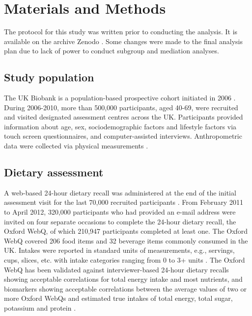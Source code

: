 \documentclass[
]{article}
\begin{document}
\hypertarget{sec2}{%
\section{Materials and Methods}\label{sec2}}

\noindent The protocol for this study was written prior to conducting
the analysis. It is available on the archive Zenodo \autocite{protocol}. Some
changes were made to the final analysis plan due to lack of power to
conduct subgroup and mediation analyses.

\hypertarget{subsec1}{%
\subsection{Study population}\label{subsec1}}

The UK Biobank is a population-based prospective cohort initiated in
2006 \autocite{sudlow2015}. During 2006-2010, more than 500,000 participants,
aged 40-69, were recruited and visited designated assessment centres
across the UK. Participants provided information about age, sex,
sociodemographic factors and lifestyle factors via touch screen
questionnaires, and computer-assisted interviews. Anthropometric data
were collected via physical measurements \autocite{RN113}.

\hypertarget{subsec2}{%
\subsection{Dietary assessment}\label{subsec2}}

A web-based 24-hour dietary recall was administered at the end of the
initial assessment visit for the last 70,000 recruited participants
\autocite{RN115}. From February 2011 to April 2012, 320,000 participants who had
provided an e-mail address were invited on four separate occasions to
complete the 24-hour dietary recall, the Oxford WebQ, of which 210,947
participants completed at least one. The Oxford WebQ covered 206 food
items and 32 beverage items commonly consumed in the UK. Intakes were
reported in standard units of measurements, e.g., servings, cups,
slices, etc. with intake categories ranging from 0 to 3+ units
\autocite{piernas2021}. The Oxford WebQ has been validated against
interviewer-based 24-hour dietary recalls showing acceptable
correlations for total energy intake and most nutrients, and biomarkers
showing acceptable correlations between the average values of two or
more Oxford WebQs and estimated true intakes of total energy, total
sugar, potassium and protein \autocite{Liu2011,Greenwood2019}.
\end{document}
